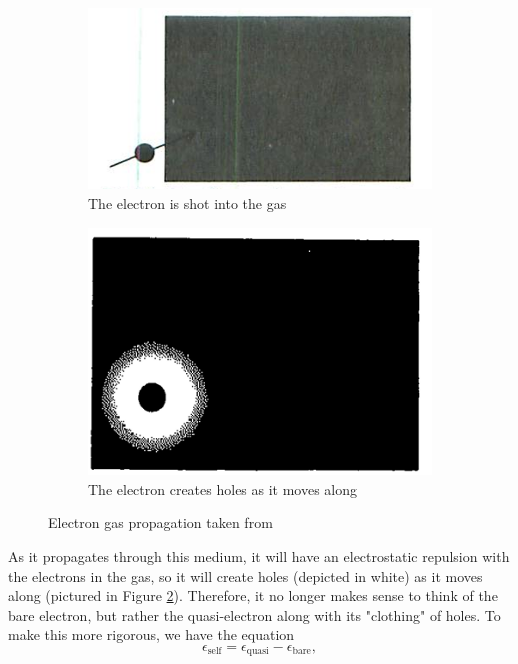 \documentclass[12pt]{article}
\begin{document}
\begin{figure}
\begin{subfigure}{.5\textwidth}
  \centering
  \includegraphics[width=.8\linewidth]{shot.png}
  \caption{The electron is shot into the gas}
  \label{fig:shot}
\end{subfigure}
\begin{subfigure}{.5\textwidth}
  \centering
  \includegraphics[width=.8\linewidth]{clothing.png}
  \caption{The electron creates holes as it moves along}
  \label{fig:clothing}
\end{subfigure}
\caption{Electron gas propagation taken from \textcite{mattuck_guide_1992}}
\label{fig:propagates}
\end{figure}
As it propagates through this medium, it will have an electrostatic repulsion with the electrons in the gas, so it will create holes (depicted in white) as it moves along (pictured in Figure \ref{fig:clothing}). Therefore, it no longer makes sense to think of the bare electron, but rather the quasi-electron along with its "clothing" of holes. To make this more rigorous, we have the equation
\begin{equation}
    \epsilon_{\text{self}} = \epsilon_{\text{quasi}} - \epsilon_{\text{bare}},
\end{equation}
\end{document}
